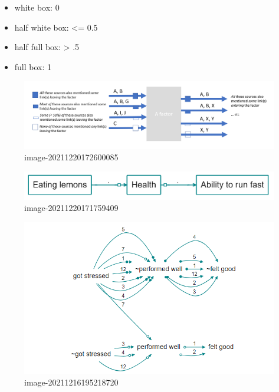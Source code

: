 \documentclass[
]{book}
\providecommand{\tightlist}{%
  \setlength{\itemsep}{0pt}\setlength{\parskip}{0pt}}
\begin{document}
\begin{itemize}
\tightlist
\item
  white box: 0
\item
  half white box: \textless= 0.5
\item
  half full box: \textgreater{} .5
\item
  full box: 1
\end{itemize}

\begin{figure}
\centering
\includegraphics[width=6.77083in,height=\textheight]{_assets/image-20211220172600085.png}
\caption{image-20211220172600085}
\end{figure}

\begin{figure}
\centering
\includegraphics[width=6.77083in,height=\textheight]{_assets/image-20211220171759409.png}
\caption{image-20211220171759409}
\end{figure}

\begin{figure}
\centering
\includegraphics[width=6.77083in,height=\textheight]{_assets/image-20211216195218720.png}
\caption{image-20211216195218720}
\end{figure}
\end{document}
